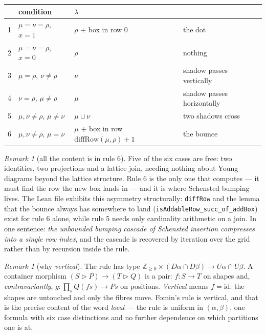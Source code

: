 \documentclass[11pt,a4paper]{article}
\theoremstyle{definition}
\theoremstyle{remark}
\newtheorem{remark}[theorem]{Remark}
\newcommand{\ZZ}{\mathbb{Z}}
\newcommand{\con}{\mathrel{\vartriangleright}}
\begin{document}
\begin{center}
\small
\renewcommand{\arraystretch}{1.15}
\begin{tabular}{@{}clll@{}}
\toprule
 & condition & $\lambda$ & \\
\midrule
1 & $\mu=\nu=\rho$, $x=1$ & $\rho$ + box in row $0$ & the dot \\
2 & $\mu=\nu=\rho$, $x=0$ & $\rho$ & nothing \\
3 & $\mu=\rho$, $\nu\ne\rho$ & $\nu$ & shadow passes vertically \\
4 & $\nu=\rho$, $\mu\ne\rho$ & $\mu$ & shadow passes horizontally \\
5 & $\mu,\nu\ne\rho$, $\mu\ne\nu$ & $\mu \sqcup \nu$ & two shadows cross \\
6 & $\mu,\nu\ne\rho$, $\mu=\nu$ & $\mu$ + box in row $\mathrm{diffRow}(\mu,\rho)+1$ & the bounce \\
\bottomrule
\end{tabular}
\end{center}

\begin{remark}[all the content is in rule 6]\label{rem:bounce}
Five of the six cases are free: two identities, two projections and a lattice join,
needing nothing about Young diagrams beyond the lattice structure. Rule 6 is the only
one that computes --- it must find the row the new box lands in --- and it is where
Schensted bumping lives. The Lean file exhibits this asymmetry structurally:
\texttt{diffRow} and the lemma that the bounce always has somewhere to land
(\texttt{isAddableRow\_succ\_of\_addBox}) exist for rule 6 alone, while rule 5 needs
only cardinality arithmetic on a join. In one sentence: \emph{the unbounded bumping
cascade of Schensted insertion compresses into a single row index}, and the
cascade is recovered by iteration over the grid rather than by recursion inside
the rule.
\end{remark}

\begin{remark}[why \emph{vertical}]\label{rem:vertical}
The rule has type $\ZZ_{\ge0}\times(D\alpha \cap D\beta) \to U\alpha \cap U\beta$. A
container morphism $(S\con P) \to (T \con Q)$ is a pair: $f : S \to T$ on shapes and,
\emph{contravariantly}, $g : \prod_{s} Q(f s) \to P s$ on positions. \emph{Vertical}
means $f = \mathrm{id}$: the shapes are untouched and only the fibres move. Fomin's
rule is vertical, and that is the precise content of the word \emph{local} --- the
rule is uniform in $(\alpha,\beta)$, one formula with six case distinctions and no
further dependence on which partitions one is at.
\end{remark}
\end{document}

